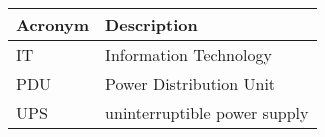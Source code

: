 \addtocounter{table}{-1}
\begin{longtable}{p{}p{}}\hline
\textbf{Acronym} & \textbf{Description}  \\\hline

IT & Information Technology \\\hline
PDU & Power Distribution Unit \\\hline
UPS & uninterruptible power supply \\\hline
\end{longtable}

